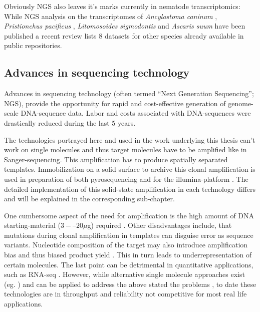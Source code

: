 Obviously NGS also leaves it's marks currently in nematode
transcriptomics: While NGS analysis on the transcriptomes of
\textit{Ancylostoma caninum} \cite{pmid20470405}, \textit{Pristionchus
  pacificus} \cite{pmid20237107}, \textit{Litomosoides sigmodontis}
\cite{pmid20950480} and \textit{Ascaris suum} \cite{pmid21685128} have
been published a recent review \cite{pmid22044053} lists 8 datasets
for other species already available in public repositories.

\subsection{Advances in sequencing technology}
\label{sec:ad-seq}

Advances in sequencing technology (often termed ``Next Generation
Sequencing''; NGS), provide the opportunity for rapid and
cost-effective generation of genome-scale DNA-sequence data. Labor
and costs associated with DNA-sequences were drastically reduced
during the last 5 years.



The technologies portrayed here and used in the work underlying this
thesis can't work on single molecules and thus target molecules have
to be amplified like in Sanger-sequencing. This amplification has to
produce spatially separated templates. Immobilization on a solid
surface to archive this clonal amplification is used in preparation of
both pyrosequencing and for the illumina-platform
\cite{pmid19997069}. The detailed implementation of this solid-state
amplification in each technology differs and will be explained in the
corresponding sub-chapter.

One cumbersome aspect of the need for amplification is the high amount
of DNA starting-material ($3 -– 20 \mu$g) required
\cite{pmid19997069}. Other disadvantages include, that mutations during
clonal amplification in templates can disguise error as sequence
variants. Nucleotide composition of the target may also introduce
amplification bias and thus biased product yield
\cite{pmid19327155}. This in turn leads to underrepresentation of
certain molecules. The last point can be detrimental in quantitative
applications, such as RNA-seq \cite{pmid19015660}. However, while
alternative single molecule approaches exist (eg. \cite{pmid21431759,
  pmid21572978}) and can be applied to address the above stated the
problems \cite{pmid21431761, pmid21957044}, to date these technologies
are in throughput and reliability not competitive for most real life
applications.


